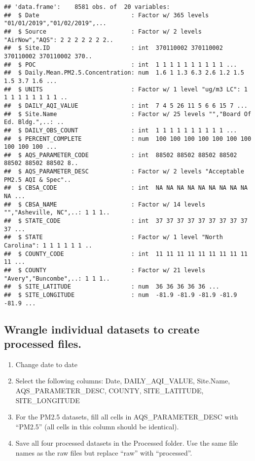 \documentclass[
]{article}
\providecommand{\tightlist}{%
  \setlength{\itemsep}{0pt}\setlength{\parskip}{0pt}}
\begin{document}
\begin{verbatim}
## 'data.frame':    8581 obs. of  20 variables:
##  $ Date                          : Factor w/ 365 levels "01/01/2019","01/02/2019",...
##  $ Source                        : Factor w/ 2 levels "AirNow","AQS": 2 2 2 2 2 2 2..
##  $ Site.ID                       : int  370110002 370110002 370110002 370110002 370..
##  $ POC                           : int  1 1 1 1 1 1 1 1 1 1 ...
##  $ Daily.Mean.PM2.5.Concentration: num  1.6 1 1.3 6.3 2.6 1.2 1.5 1.5 3.7 1.6 ...
##  $ UNITS                         : Factor w/ 1 level "ug/m3 LC": 1 1 1 1 1 1 1 1 1 ..
##  $ DAILY_AQI_VALUE               : int  7 4 5 26 11 5 6 6 15 7 ...
##  $ Site.Name                     : Factor w/ 25 levels "","Board Of Ed. Bldg.",..: ..
##  $ DAILY_OBS_COUNT               : int  1 1 1 1 1 1 1 1 1 1 ...
##  $ PERCENT_COMPLETE              : num  100 100 100 100 100 100 100 100 100 100 ...
##  $ AQS_PARAMETER_CODE            : int  88502 88502 88502 88502 88502 88502 88502 8..
##  $ AQS_PARAMETER_DESC            : Factor w/ 2 levels "Acceptable PM2.5 AQI & Spec"..
##  $ CBSA_CODE                     : int  NA NA NA NA NA NA NA NA NA NA ...
##  $ CBSA_NAME                     : Factor w/ 14 levels "","Asheville, NC",..: 1 1 1..
##  $ STATE_CODE                    : int  37 37 37 37 37 37 37 37 37 37 ...
##  $ STATE                         : Factor w/ 1 level "North Carolina": 1 1 1 1 1 1 ..
##  $ COUNTY_CODE                   : int  11 11 11 11 11 11 11 11 11 11 ...
##  $ COUNTY                        : Factor w/ 21 levels "Avery","Buncombe",..: 1 1 1..
##  $ SITE_LATITUDE                 : num  36 36 36 36 36 ...
##  $ SITE_LONGITUDE                : num  -81.9 -81.9 -81.9 -81.9 -81.9 ...
\end{verbatim}

\hypertarget{wrangle-individual-datasets-to-create-processed-files.}{%
\subsection{Wrangle individual datasets to create processed
files.}\label{wrangle-individual-datasets-to-create-processed-files.}}

\begin{enumerate}
\def\labelenumi{\arabic{enumi}.}
\setcounter{enumi}{2}
\tightlist
\item
  Change date to date
\item
  Select the following columns: Date, DAILY\_AQI\_VALUE, Site.Name,
  AQS\_PARAMETER\_DESC, COUNTY, SITE\_LATITUDE, SITE\_LONGITUDE
\item
  For the PM2.5 datasets, fill all cells in AQS\_PARAMETER\_DESC with
  ``PM2.5'' (all cells in this column should be identical).
\item
  Save all four processed datasets in the Processed folder. Use the same
  file names as the raw files but replace ``raw'' with ``processed''.
\end{enumerate}
\end{document}
